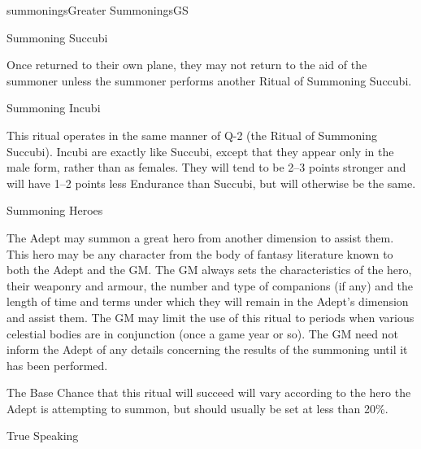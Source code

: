 \begin{College}[1.0]{summonings}{Greater Summonings}{GS}
\begin{ritual}[Q-2]{Summoning Succubi}
\begin{effects}
Once returned to their own plane, they may not return to the aid of
the summoner unless the summoner performs another Ritual of Summoning
Succubi.
\end{effects}
\end{ritual}

\begin{ritual}[Q-3]{Summoning Incubi}

\begin{effects}
This ritual operates in the same manner of Q-2 (the Ritual of
Summoning Succubi).  Incubi are exactly like Succubi, except that they
appear only in the male form, rather than as females. They will tend
to be 2–3 points stronger and will have 1–2 points less Endurance than
Succubi, but will otherwise be the same.
\end{effects}
\end{ritual}

\begin{ritual}[Q-4]{Summoning Heroes}

\begin{effects}
The Adept may summon a great hero from another dimension to assist
them. This hero may be any character from the body of fantasy
literature known to both the Adept and the GM.  The GM always sets the
characteristics of the hero, their weaponry and armour, the number and
type of companions (if any) and the length of time and terms under
which they will remain in the Adept’s dimension and assist them. The
GM may limit the use of this ritual to periods when various celestial
bodies are in conjunction (once a game year or so).  The GM need not
inform the Adept of any details concerning the results of the
summoning until it has been performed.

The Base Chance that this ritual will succeed will vary according to
the hero the Adept is attempting to summon, but should usually be set
at less than 20\%.
\end{effects}
\end{ritual}

\begin{ritual}[Q-5]{True Speaking}


\end{ritual}
\end{College}
